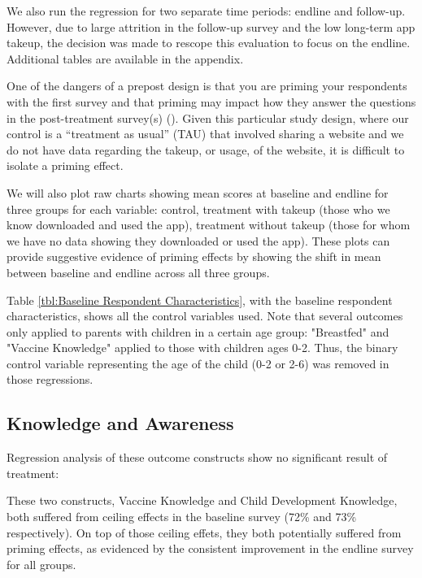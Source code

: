 \documentclass{article}
\begin{document}
We also run the regression for two separate time periods: endline and follow-up. However, due to large attrition in the follow-up survey and the low long-term app takeup, the decision was made to rescope this evaluation to focus on the endline. Additional tables are available in the appendix.

One of the dangers of a prepost design is that you are priming your respondents with the first survey and that priming may impact how they answer the questions in the post-treatment survey(s) (\cite{Stantcheva2023}). Given this particular study design, where our control is a ``treatment as usual'' (TAU) that involved sharing a website and we do not have data regarding the takeup, or usage, of the website, it is difficult to isolate a priming effect.

We will also plot raw charts showing mean scores at baseline and endline for three groups for each variable: control, treatment with takeup (those who we know downloaded and used the app), treatment without takeup (those for whom we have no data showing they downloaded or used the app). These plots can provide suggestive evidence of priming effects by showing the shift in mean between baseline and endline across all three groups.

Table \ref{tbl:Baseline Respondent Characteristics}, with the baseline respondent characteristics, shows all the control variables used. Note that several outcomes only applied to parents with children in a certain age group: "Breastfed" and "Vaccine Knowledge" applied to those with children ages 0-2. Thus, the binary control variable representing the age of the child (0-2 or 2-6) was removed in those regressions.

\subsection*{Knowledge and Awareness}

Regression analysis of these outcome constructs show no significant result of treatment:



These two constructs, Vaccine Knowledge and Child Development Knowledge, both suffered from ceiling effects in the baseline survey (72\% and 73\% respectively). On top of those ceiling effets, they both potentially suffered from priming effects, as evidenced by the consistent improvement in the endline survey for all groups.
\end{document}
